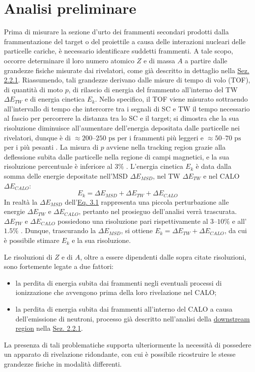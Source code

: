 \documentclass[12pt,a4paper,twoside]{report}
\begin{document}
	\section{Analisi preliminare}\label{sec:fragment_identification}
	Prima di misurare la sezione d'urto dei frammenti secondari prodotti dalla frammentazione del target o del proiettile a causa delle interazioni nucleari delle particelle cariche, è necessario identificare suddetti frammenti. A tale scopo, occorre determinare il loro numero atomico $Z$ e di massa $A$ a partire dalle grandezze fisiche misurate dai rivelatori, come già descritto in dettaglio nella \hyperref[sec:setupElettronico]{Sez. 2.2.1}. Riassumendo, tali grandezze derivano dalle misure di tempo di volo (TOF), di quantità di moto $p$, di rilascio di energia del frammento all'interno del TW $\Delta E_{TW}$ e di energia cinetica $E_k$. Nello specifico, il TOF viene misurato sottraendo all'intervallo di tempo che intercorre tra i segnali di SC e TW il tempo necessario al fascio per percorrere la distanza tra lo SC e il target; si dimostra che la sua risoluzione diminuisce all'aumentare dell'energia depositata dalle particelle nei rivelatori, dunque è di $\approx200$--$250\mbox{ ps}$ per i frammenti più leggeri e $\approx50$--$70\mbox{ ps}$ per i più pesanti \cite{foot_cdr}. La misura di $p$ avviene nella tracking region grazie alla deflessione subita dalle particelle nella regione di campi magnetici, e la sua risoluzione percentuale è inferiore al $3\%$ \cite{foot_cdr}. L'energia cinetica $E_k$ è data dalla somma delle energie depositate nell'MSD $\Delta E_{MSD}$, nel TW $\Delta E_{TW}$ e nel CALO $\Delta E_{CALO}$:
	\begin{equation}
		E_k=\Delta E_{MSD}+\Delta E_{TW}+\Delta E_{CALO}
		\label{eq:deposited_energy}
	\end{equation}
	In realtà la $\Delta E_{MSD}$ dell'\hyperref[eq:deposited_energy]{Eq. 3.1} rappresenta una piccola perturbazione alle energie $\Delta E_{TW}$ e $\Delta E_{CALO}$, pertanto nel prosieguo dell'analisi verrà trascurata. $\Delta E_{TW}$ e $\Delta E_{CALO}$ possiedono una risoluzione pari rispettivamente al $3$--$10\%$ e all'$1.5\%$ \cite{foot_cdr}. Dunque, trascurando la $\Delta E_{MSD}$, si ottiene $E_k=\Delta E_{TW}+\Delta E_{CALO}$, da cui è possibile stimare $E_k$ e la sua risoluzione.
	
	Le risoluzioni di $Z$ e di $A$, oltre a essere dipendenti dalle sopra citate risoluzioni, sono fortemente legate a due fattori:
	\begin{itemize}
		\item la perdita di energia subita dai frammenti negli eventuali processi di ionizzazione che avvengono prima della loro rivelazione nel CALO;
		\item la perdita di energia subita dai frammenti all'interno del CALO a causa dell'emissione di neutroni, processo già descritto nell'analisi della \hyperref[par:downstream_region]{downstream region} nella \hyperref[sec:setupElettronico]{Sez. 2.2.1}.
	\end{itemize}
	La presenza di tali problematiche supporta ulteriormente la necessità di possedere un apparato di rivelazione ridondante, con cui è possibile ricostruire le stesse grandezze fisiche in modalità differenti.
	
\end{document}

